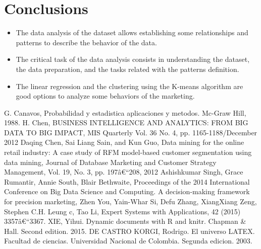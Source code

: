 \documentclass[conference]{IEEEtran}\usepackage[]{graphicx}\usepackage[]{color}
\begin{document}
\section{Conclusions}
\begin{itemize}
 \item The data analysis of the dataset allows establishing some relationships and patterns to describe the behavior of the data.
 \item The critical task of the data analysis consists in understanding the dataset, the data preparation, and the tasks related with the patterns definition.
 \item The linear regression and the clustering using the K-means algorithm are good options to analyze some behaviors of the marketing.
 
 
\end{itemize}




\begin{thebibliography}{1}
		
	 G. Canavos, Probabilidad y estadistica aplicaciones y metodos. Mc-Graw Hill, 1988. 
	 H. Chen, BUSINESS INTELLIGENCE AND ANALYTICS: FROM BIG DATA TO BIG IMPACT, MIS Quarterly Vol. 36 No. 4, pp. 1165-1188/December 2012 
	 Daqing Chen, Sai Liang Sain, and Kun Guo, Data mining for the online retail industry: A case study of RFM model-based customer segmentation using data mining, Journal of Database Marketing and Customer Strategy Management, Vol. 19, No. 3, pp. 197â€“208, 2012 
	 Ashishkumar Singh, Grace Rumantir, Annie South, Blair Bethwaite, Proceedings of the 2014 International Conference on Big Data Science and Computing.
	 A decision-making framework for precision marketing, Zhen You, Yain-Whar Si, Defu Zhang, XiangXiang Zeng, Stephen C.H. Leung c, Tao Li, Expert Systems with Applications, 42 (2015) 3357â€“3367.
	 XIE, Yihui. Dynamic documents with R and knitr. Chapman \& Hall. Second edition. 2015.  
	 DE CASTRO KORGI, Rodrigo. El universo LATEX. Facultad de ciencias. Universidad Nacional de Colombia. Segunda edicion. 2003.  

\end{thebibliography}
\end{document}
